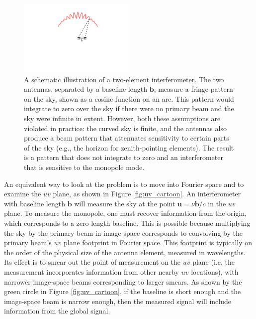 \documentclass[twocolumn,apj,numberedappendix]{emulateapj}
\def\b{\mathbf{b}}
\begin{document}
\begin{figure}[t]
	\centering
	\includegraphics[width=0.50\textwidth] {figures/beam_pattern_cartoon.pdf}
	\caption{A schematic illustration of a two-element interferometer. The two antennas, separated by a baseline length $\b$, measure a fringe pattern on the sky, shown as a cosine function on an arc. This pattern would integrate to zero over the sky if there were no primary beam and the sky were infinite in extent. However, both these assumptions are violated in practice: the curved sky is finite, and the antennas also produce a beam pattern that attenuates sensitivity to certain parts of the sky (e.g., the horizon for zenith-pointing elements). The result is a pattern that does not integrate to zero and an interferometer that is sensitive to the monopole mode.}
	\label{fig:beam_pattern_cartoon}
\end{figure}

An equivalent way to look at the problem is to move into Fourier space and to examine the $uv$ plane, as shown in Figure \ref{fig:uv_cartoon}. An interferometer with baseline length $\b$ will measure the sky at the point $\mathbf{u} = \nu\b/c$ in the $uv$ plane. To measure the monopole, one must recover information from the origin, which corresponds to a zero-length baseline. This is possible because multiplying the sky by the primary beam in image space corresponds to convolving by the primary beam's $uv$ plane footprint in Fourier space. This footprint is typically on the order of the physical size of the antenna element, measured in wavelengths. Its effect is to smear out the point of measurement on the $uv$ plane (i.e. the measurement incorporates information from other nearby $uv$ locations), with narrower image-space beams corresponding to larger smears. As shown by the green circle in Figure \ref{fig:uv_cartoon}, if the baseline is short enough and the image-space beam is narrow enough, then the measured signal will include information from the global signal.
\end{document}
